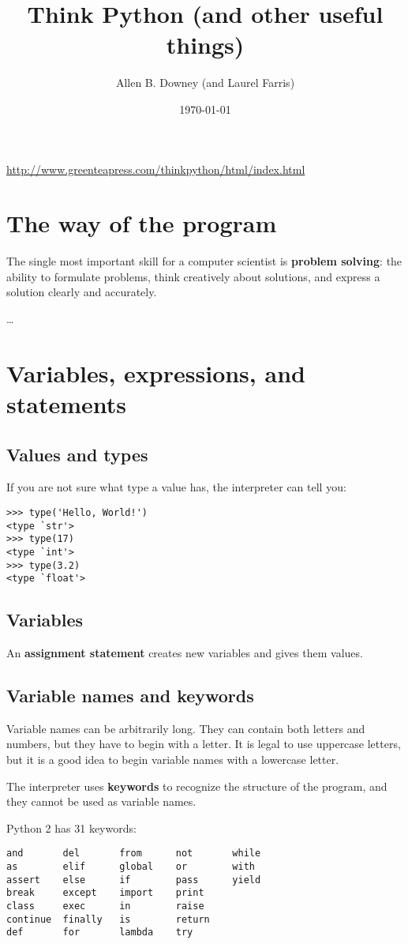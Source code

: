 \documentclass{article}
\title{Think Python (and other useful things)}
\author{Allen B. Downey (and Laurel Farris)}
\date{\today}
\begin{document}
\maketitle
\url{http://www.greenteapress.com/thinkpython/html/index.html}
\tableofcontents\newpage

\section{The way of the program}

The single most important skill for a computer scientist is \textbf{problem
solving}: the ability to formulate problems, think creatively about solutions,
and express a solution clearly and accurately.

\ldots

\section{Variables, expressions, and statements}
\subsection{Values and types}
If you are not sure what type a value has, the interpreter can tell
you:
\begin{lstlisting}
>>> type('Hello, World!')
<type `str'>
>>> type(17)
<type `int'>
>>> type(3.2)
<type `float'>
\end{lstlisting}
\subsection{Variables}
An \textbf{assignment statement} creates new variables and gives them values.
\subsection{Variable names and keywords}
Variable names can be arbitrarily long. They can contain both letters
and numbers, but they have to begin with a letter. It is legal to use
uppercase letters, but it is a good idea to begin variable names with
a lowercase letter.

The interpreter uses \textbf{keywords} to recognize the structure of the
program, and they cannot be used as variable names.

Python 2 has 31 keywords:
\begin{verbatim}
and       del       from      not       while
as        elif      global    or        with
assert    else      if        pass      yield
break     except    import    print
class     exec      in        raise
continue  finally   is        return
def       for       lambda    try
\end{verbatim}
\end{document}
